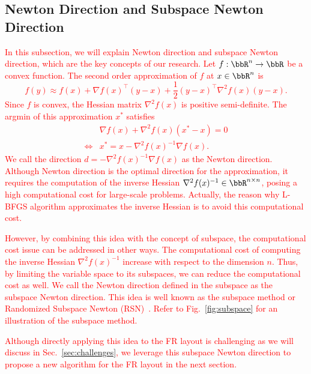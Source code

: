 \documentclass[dvipdfmx,10pt,journal,compsoc]{IEEEtran}
\newcommand{\red}[1]{\textcolor{red}{#1}}
\begin{document}
\subsection{Newton Direction and Subspace Newton Direction}\label{ssec:introNewton}

\red{
    In this subsection, we will explain Newton direction and subspace Newton direction, which are the key concepts of our research.
    Let $f: \bbR^n \to \bbR$ be a convex function.
    The second order approximation of $f$ at $x \in \bbR^n$ is
    \begin{equation*}
        f(y) \approx f(x) + \nabla f(x)^\top (y - x) + \frac{1}{2} (y - x)^\top \nabla^2 f(x) (y - x).
    \end{equation*}
    Since $f$ is convex, the Hessian matrix $\nabla^2 f(x)$ is positive semi-definite.
    The argmin of this approximation $x^*$ satisfies
    \begin{align*}
             & \nabla f(x) + \nabla^2 f(x) (x^* - x) = 0 \\
        \iff & x^* = x - \nabla^2 f(x)^{-1} \nabla f(x).
    \end{align*}
    We call the direction $d = -\nabla^2 f(x)^{-1} \nabla f(x)$ as the Newton direction.
    Although Newton direction is the optimal direction for the approximation, it requires the computation of the inverse Hessian $\nabla^2 f(x)^{-1} \in \bbR^{n \times n}$, posing a high computational cost for large-scale problems. Actually, the reason why L-BFGS algorithm approximates the inverse Hessian is to avoid this computational cost.
}

\red{
    However, by combining this idea with the concept of subspace, the computational cost issue can be addressed in other ways.
    The computational cost of computing the inverse Hessian $\nabla^2 f(x)^{-1}$ increase with respect to the dimension $n$. Thus, by limiting the variable space to its subspaces, we can reduce the computational cost as well.
    We call the Newton direction defined in the subspace as the subspace Newton direction.
    This idea is well known as the subspace method or Randomized Subspace Newton (RSN)~\cite{NEURIPS2019_bc6dc48b}.
    Refer to Fig.~\ref{fig:subspace} for an illustration of the subspace method.
}

\red{
    Although directly applying this idea to the FR layout is challenging as we will discuss in Sec.~\ref{sec:challenges}, we leverage this subspace Newton direction to propose a new algorithm for the FR layout in the next section.
}
\end{document}
